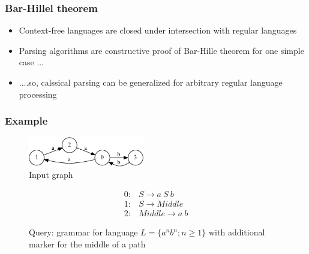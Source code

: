 \documentclass{beamer}
\begin{document}
\begin{frame}
  \transwipe[direction=90]
  \frametitle{Bar-Hillel theorem}
  \begin{itemize}
    \item Context-free languages are closed under intersection with regular languages
    \item Parsing algorithms are constructive proof of Bar-Hille theorem for one simple case ...
    \item ....so, calssical parsing can be generalized for arbitrary regular language processing
  \end{itemize}
\end{frame}

\begin{frame}
  \transwipe[direction=90]
  \frametitle{Example}
\begin{figure}[ht]
    \centering
        \includegraphics[width=0.45\textwidth]{pictures/input.pdf}
        \caption{Input graph}
\end{figure}
\begin{figure}[ht]
\centering
   \[
\begin{array}{rl} 
   0:& S \rightarrow a \ S \ b \\
   1:& S \rightarrow Middle \\
   2:& Middle \rightarrow a \ b
\end{array}
\]
   \caption{Query: grammar for language $L=\{a^n b^n; n \geq 1\}$ with additional marker for the middle of a path}
   \label{grammarG}        
    \end{figure}
\end{frame}
\end{document}
